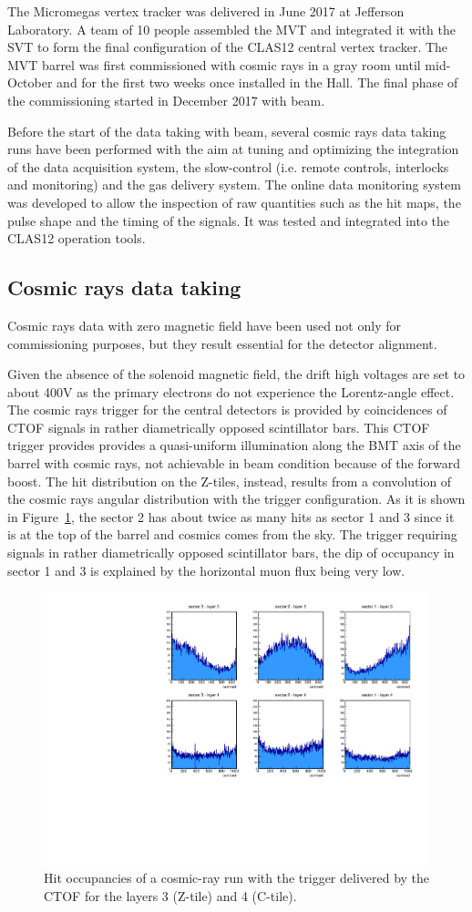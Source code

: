 The Micromegas vertex tracker was delivered in June 2017 at Jefferson Laboratory. A team of 10 people assembled the MVT and integrated it with the SVT to form the final configuration of the CLAS12 central vertex tracker.  The MVT barrel was first commissioned with cosmic rays in a gray room until mid-October and for the first two weeks once installed in the Hall. The final phase of the commissioning started in December 2017 with beam.

Before the start of the data taking with beam, several cosmic rays data taking runs have been performed with the aim at tuning and optimizing the integration of the data acquisition system, the slow-control (i.e. remote controls, interlocks and monitoring) and the gas delivery system. The online data monitoring system was developed to allow the inspection of raw quantities such as the hit maps, the pulse shape and the timing of the signals. It was tested and integrated into the CLAS12 operation tools. 

\subsection{Cosmic rays data taking}

Cosmic rays data with zero magnetic field have been used not only for commissioning purposes, but they result essential for the detector alignment.

Given the absence of the solenoid magnetic field, the drift high voltages are set to about 400V as the primary electrons do not experience the Lorentz-angle effect. The cosmic rays trigger for the central detectors is provided by coincidences of CTOF signals in rather diametrically opposed scintillator bars. This CTOF trigger provides provides a quasi-uniform illumination along the BMT axis of the barrel with cosmic rays, not achievable in beam condition because of the forward boost. The hit distribution on the Z-tiles, instead, results from a convolution of the cosmic rays angular distribution with the trigger configuration. As it is shown in Figure~\ref{fig:mm-cosmic_occupancy}, the sector 2 has about twice as many hits as sector 1 and 3 since it is at the top of the barrel and cosmics comes from the sky. The trigger requiring signals in rather diametrically opposed scintillator bars, the dip of occupancy in sector 1 and 3 is explained by the horizontal muon flux being very low.

\begin{figure}[htb]
 \includegraphics[width=.45\textwidth]{images/BMT_hit_cosmics_CTOFtrigger.pdf}
 \caption{Hit occupancies of a cosmic-ray run with the trigger delivered by the CTOF for the layers 3 (Z-tile) and 4 (C-tile).}
 \label{fig:mm-cosmic_occupancy}
\end{figure}

